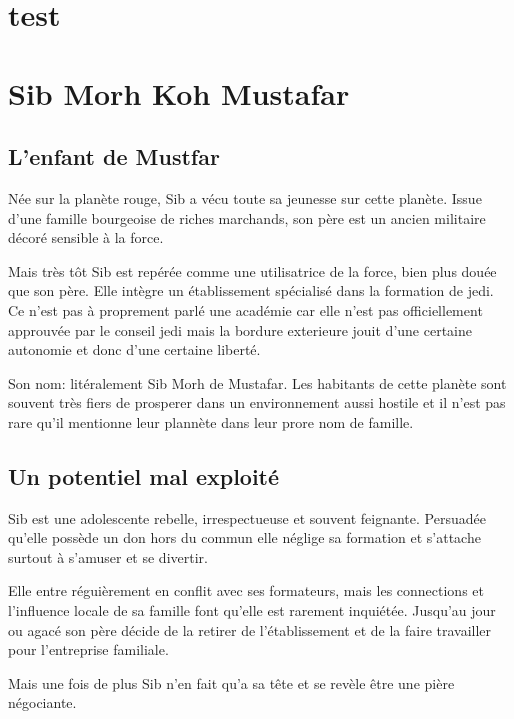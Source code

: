 \documentclass[10pt,a4paper,twoside,twocolumn,openany]{book}
\begin{document}
\chapter{test}


\chapter{Sib Morh Koh Mustafar}

\section{L'enfant de Mustfar}

Née sur la planète rouge, Sib a vécu toute sa jeunesse sur cette planète. Issue d'une famille
bourgeoise de riches marchands, son père est un ancien militaire décoré sensible à la force.

Mais très tôt Sib est repérée comme une utilisatrice de la force, bien plus douée que son père. Elle intègre
un établissement spécialisé dans la formation de jedi. Ce n'est pas à proprement parlé une académie car elle n'est pas officiellement approuvée par le conseil jedi mais la bordure exterieure jouit d'une certaine autonomie et donc d'une certaine liberté.

\begin{commentbox}{}
Son nom: litéralement Sib Morh de Mustafar. Les habitants de cette planète sont souvent très fiers de prosperer dans un
environnement aussi hostile et il n'est pas rare qu'il mentionne leur plannète dans leur prore nom de famille.
\end{commentbox}

\section{Un potentiel mal exploité}

Sib est une adolescente rebelle, irrespectueuse et souvent feignante. Persuadée qu'elle possède un don hors du commun elle néglige sa formation et s'attache surtout à s'amuser et se divertir.

Elle entre réguièrement en conflit avec ses formateurs, mais les connections et l'influence locale de sa famille font qu'elle est rarement inquiétée. Jusqu'au jour ou agacé son père décide de la retirer de l'établissement et de la faire travailler pour l'entreprise familiale.

Mais une fois de plus Sib n'en fait qu'a sa tête et se revèle être une pière négociante.
\end{document}
